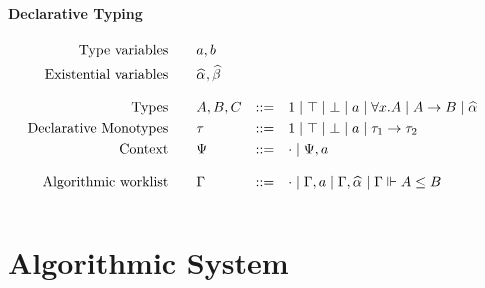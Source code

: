 \paragraph{Declarative Typing}



$$\begin{aligned}
\text{Type variables}\qquad&a, b\\
\text{Existential variables}\qquad&\al, \bt\\[3mm]
\text{Types}\qquad&A, B, C &::=&\quad 1 \mid \top \mid \bot \mid a \mid \forall x. A \mid A\to B \mid \al\\
\text{Declarative Monotypes}\qquad&\tau &::=&\quad 1 \mid \top \mid \bot \mid a \mid \tau_1\to \tau_2\\
\text{Context}\qquad&\Psi &::=&\quad \cdot \mid \Psi, a
\\[3mm]
\text{Algorithmic worklist}\qquad&\Gm &::=&\quad \cdot \mid \Gm, a \mid \Gm, \al \mid \Gm \Vdash A \le B\\[3mm]
\end{aligned}$$







\section{Algorithmic System}

\setcounter{algRuleCounter}{0}

